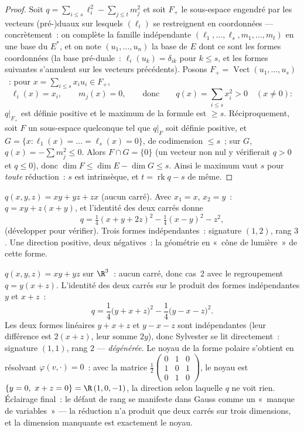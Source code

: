 \begin{proof}
Soit $q = \sum_{i \leq s}\ell_i^2 - \sum_{j\leq t} m_j^2$ et soit
$F_+$ le sous-espace engendré par les vecteurs (pré-)duaux sur
lesquels $(\ell_i)$ se restreignent en coordonnées ---
concrètement~: on complète la famille indépendante $(\ell_1, \dots,
\ell_s, m_1, \dots, m_t)$ en une base du  $E^*$, et on note
$(u_1, \dots, u_n)$ la base de $E$ dont ce sont les formes
coordonnées (la base pré-duale~: $\ell_i(u_k) = \delta_{ik}$ pour $k
\leq s$, et les formes suivantes s'annulent sur les vecteurs
précédents). Posons $F_+ = \operatorname{Vect}(u_1, \dots, u_s)$~:
pour $x = \sum_{i\leq s}x_iu_i \in F_+$,
\[
\ell_i(x) = x_i,
\qquad m_j(x) = 0,
\qquad\text{donc}\qquad
q(x) = \sum_{i\leq s}x_i^2 > 0 \quad (x \neq 0) :
\]
$q|_{F_+}$ est définie positive et le maximum de la formule est
$\geq s$. Réciproquement, soit $F$ un sous-espace quelconque tel que
$q|_F$ soit définie positive, et $G = \{x : \ell_1(x) = \dots =
\ell_s(x) = 0\}$, de codimension $\leq s$~; sur $G$, $q(x) = -\sum
m_j^2 \leq 0$. Alors $F \cap G = \{0\}$ (un vecteur non nul y
vérifierait $q > 0$ et $q \leq 0$), donc $\dim F \leq \dim E - \dim
G \leq s$. Ainsi le maximum vaut $s$ pour \emph{toute} réduction~:
$s$ est intrinsèque, et $t = \operatorname{rk} q - s$ de même.
\end{proof}

\begin{example}\label{ex:b2:quadratic:gaussexample}
$q(x, y, z) = xy + yz + zx$ (aucun carré). Avec $x_1 = x$, $x_2 =
y$~: $q = xy + z(x + y)$, et l'identité des deux carrés donne
\[
q = \tfrac14(x + y + 2z)^2 - \tfrac14(x - y)^2 - z^2 ,
\]
(développer pour vérifier). Trois formes indépendantes~: signature
$(1, 2)$, rang $3$. Une direction positive, deux négatives~: la
géométrie en «~cône de lumière~» de cette forme.
\end{example}

\begin{example}\label{ex:b2:quadratic:degenerate}
$q(x, y, z) = xy + yz$ sur $\R^3$~: aucun carré, donc cas~2 avec le
regroupement $q = y(x + z)$. L'identité des deux carrés sur le
produit des formes indépendantes $y$ et $x + z$~:
\[
q = \frac14\bigl(y + x + z\bigr)^2 -
\frac14\bigl(y - x - z\bigr)^2 .
\]
Les deux formes linéaires $y + x + z$ et $y - x - z$ sont
indépendantes (leur différence est $2(x+z)$, leur somme $2y$), donc
Sylvester se lit directement~: signature $(1, 1)$, rang $2$ ---
\emph{dégénérée}. Le noyau de la forme polaire s'obtient en
résolvant $\varphi(v, \cdot) = 0$~: avec la matrice
$\frac12\begin{pmatrix} 0&1&0\\ 1&0&1\\ 0&1&0\end{pmatrix}$,
le noyau est $\{y = 0,\ x + z = 0\} = \R\,(1, 0, -1)$, la
direction selon laquelle $q$ ne voit rien. Éclairage final~: le
défaut de rang se manifeste dans Gauss comme un «~manque de
variables~» --- la réduction n'a produit que deux carrés sur trois
dimensions, et la dimension manquante est exactement le noyau.
\end{example}

